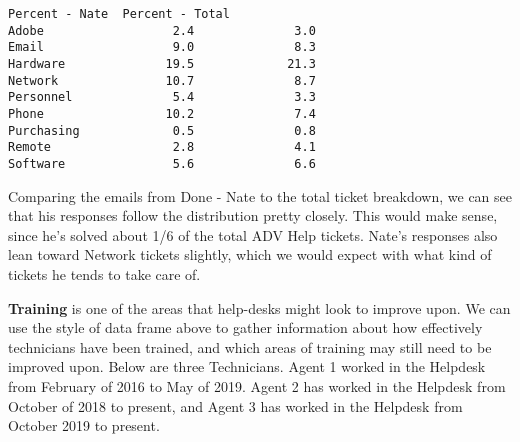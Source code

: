 \documentclass[11pt]{article}
\begin{document}
    \begin{Verbatim}[commandchars=\\\{\}]
            Percent - Nate  Percent - Total
Adobe                  2.4              3.0
Email                  9.0              8.3
Hardware              19.5             21.3
Network               10.7              8.7
Personnel              5.4              3.3
Phone                 10.2              7.4
Purchasing             0.5              0.8
Remote                 2.8              4.1
Software               5.6              6.6

    \end{Verbatim}
 
    Comparing the emails from Done - Nate to the total ticket breakdown, we
can see that his responses follow the distribution pretty closely. This
would make sense, since he's solved about 1/6 of the total ADV Help
tickets. Nate's responses also lean toward Network tickets slightly,
which we would expect with what kind of tickets he tends to take care
of.


    \textbf{Training} is one of the areas that help-desks might look to
improve upon. We can use the style of data frame above to gather
information about how effectively technicians have been trained, and
which areas of training may still need to be improved upon. Below are
three Technicians. Agent 1 worked in the Helpdesk from February of 2016
to May of 2019. Agent 2 has worked in the Helpdesk from October of 2018
to present, and Agent 3 has worked in the Helpdesk from October 2019 to
present.
\end{document}

